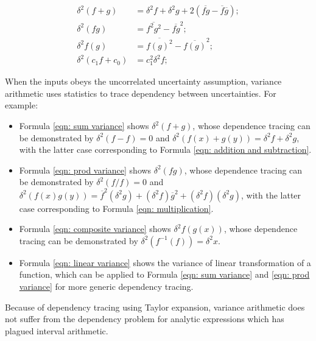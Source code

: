\documentclass[twoside]{article}
\numberwithin{equation}{section}
\begin{document}
\fi

\begin{align}
\label{eqn: sum variance}
\delta^2 (f + g) &= \delta^2 f + \delta^2 g + 2 (\overline{fg} - \overline{f}\overline{g}); \\
\label{eqn: prod variance}
\delta^2 (f g) &= \overline{f^2 g^2} - \overline{f g}^2; \\
\label{eqn: composite variance}
\delta^2 f(g) &= \overline{f(g)^2} - \overline{f(g)}^2; \\
\label{eqn: linear variance}
\delta^2 (c_1 f + c_0) &= c_1^2 \delta^2f; 
\end{align}

When the inputs obeys the uncorrelated uncertainty assumption, variance arithmetic uses statistics to trace dependency between uncertainties.
For example:
\begin{itemize}
\item Formula \eqref{eqn: sum variance} shows $\delta^2 (f + g)$, whose dependence tracing can be demonstrated by $\delta^2 (f - f) = 0$  and $\delta^2 (f(x) + g(y)) = \delta^2 f + \delta^2 g$, with the latter case corresponding to Formula \eqref{eqn: addition and subtraction}.  

\item Formula \eqref{eqn: prod variance} shows  $\delta^2 (f g)$, whose dependence tracing can be demonstrated by $\delta^2 (f/f) = 0$  and $\delta^2 (f(x) g(y)) = \overline{f}^2 (\delta^2 g) + (\delta^2 f) \overline{g}^2 +  (\delta^2 f) (\delta^2 g)$, with the latter case corresponding to Formula \eqref{eqn: multiplication}.  

\item Formula \eqref{eqn: composite variance} shows  $\delta^2 f(g(x))$, whose dependence tracing can be demonstrated by $\delta^2 (f^{-1}(f)) = \delta^2 x$.  

\item Formula \eqref{eqn: linear variance} shows the variance of linear transformation of a function, which can be applied to Formula \eqref{eqn: sum variance} and \eqref{eqn: prod variance} for more generic dependency tracing.
\end{itemize}
Because of dependency tracing using Taylor expansion, variance arithmetic does not suffer from the dependency problem for analytic expressions \cite{Interval_Arithmetic} which has plagued interval arithmetic.
\end{document}
